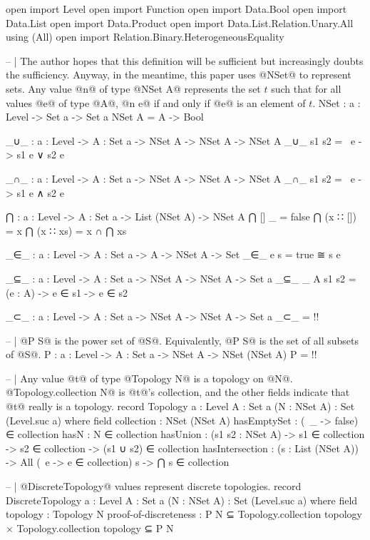 \begin{code}
open import Level
open import Function
open import Data.Bool
open import Data.List
open import Data.Product
open import Data.List.Relation.Unary.All using (All)
open import Relation.Binary.HeterogeneousEquality

-- | The author hopes that this definition will be sufficient but increasingly doubts the sufficiency.  Anyway, in the meantime, this paper uses @NSet@ to represent sets.  Any value @n@ of type @NSet A@ represents the set \(t\) such that for all values @e@ of type @A@, @n e@ if and only if @e@ is an element of \(t\).
NSet : {a : Level} -> Set a -> Set a
NSet A = A -> Bool

_∪_ : {a : Level} -> {A : Set a} -> NSet A -> NSet A -> NSet A
_∪_ s1 s2 = \ e -> s1 e ∨ s2 e

_∩_ : {a : Level} -> {A : Set a} -> NSet A -> NSet A -> NSet A
_∩_ s1 s2 = \ e -> s1 e ∧ s2 e

⋂ : {a : Level} -> {A : Set a} -> List (NSet A) -> NSet A
⋂ [] _ = false
⋂ (x ∷ []) = x
⋂ (x ∷ xs) = x ∩ ⋂ xs

_∈_ : {a : Level} -> {A : Set a} -> A -> NSet A -> Set
_∈_ e s = true ≅ s e

_⊆_ : {a : Level} -> {A : Set a} -> NSet A -> NSet A -> Set a
_⊆_ {_} {A} s1 s2 = (e : A) -> e ∈ s1 -> e ∈ s2

_⊂_ : {a : Level} -> {A : Set a} -> NSet A -> NSet A -> Set a
_⊂_ = {!!}

-- | @P S@ is the power set of @S@.  Equivalently, @P S@ is the set of all subsets of @S@.
P : {a : Level} -> {A : Set a} -> NSet A -> NSet (NSet A)
P = {!!}

-- | Any value @t@ of type @Topology N@ is a topology on @N@.  @Topology.collection N@ is @t@'s collection, and the other fields indicate that @t@ really is a topology.
record Topology {a : Level}
                {A : Set a}
                (N : NSet A) : Set (Level.suc a) where
  field
    collection : NSet (NSet A)
    hasEmptySet : (\ _ -> false) ∈ collection
    hasN : N ∈ collection
    hasUnion : (s1 s2 : NSet A) ->
               s1 ∈ collection ->
               s2 ∈ collection ->
               (s1 ∪ s2) ∈ collection
    hasIntersection : (s : List (NSet A)) ->
                      All (\ e -> e ∈ collection) s ->
                      ⋂ s ∈ collection

-- | @DiscreteTopology@ values represent discrete topologies.
record DiscreteTopology {a : Level}
                        {A : Set a}
                        (N : NSet A) : Set (Level.suc a) where
  field
    topology : Topology N
    proof-of-discreteness : P N ⊆ Topology.collection topology ×
                            Topology.collection topology ⊆ P N


\end{code}

